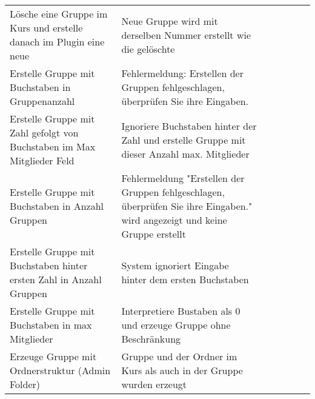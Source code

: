 \begin{table}[]
\begin{tabular}{p{6cm}p{7cm}p{3cm}llll}
      	Lösche eine Gruppe im Kurs und erstelle danach im Plugin eine neue                                                                   & Neue Gruppe wird mit derselben Nummer erstellt wie die gelöschte                                                                                                 & \checkmark           &  &  &  \\
		Erstelle Gruppe mit Buchstaben in Gruppenanzahl                                                                                      & Fehlermeldung: Erstellen der Gruppen fehlgeschlagen, überprüfen Sie ihre Eingaben.                                                                               & \checkmark           &  &  &  \\
		Erstelle Gruppe mit Zahl gefolgt von Buchstaben im Max Mitglieder Feld                                                               & Ignoriere Buchstaben hinter der Zahl und erstelle Gruppe mit dieser Anzahl max. Mitglieder                                                                         & \checkmark           &  &  &  \\
		Erstelle Gruppe mit Buchstaben in Anzahl Gruppen                                                                                     & Fehlermeldung "Erstellen der Gruppen fehlgeschlagen, überprüfen Sie ihre Eingaben."  wird angezeigt und keine Gruppe erstellt                                    & \checkmark           &  &  &  \\
		Erstelle Gruppe mit Buchstaben hinter ersten Zahl in Anzahl Gruppen                                                                  & System ignoriert Eingabe hinter dem ersten Buchstaben                                                                                                           & \checkmark           &  &  &  \\
		Erstelle Gruppe mit Buchstaben in max Mitglieder                                                                                     & Interpretiere Bustaben als 0 und erzeuge Gruppe ohne Beschränkung                                                                                                & \checkmark           &  &  &  \\
		Erzeuge Gruppe mit Ordnerstruktur (Admin Folder)                                                                                     & Gruppe und der Ordner im Kurs als auch in der Gruppe wurden erzeugt                                                                                              & \checkmark           &  &  &  \\
			\end{tabular}
\end{table}

